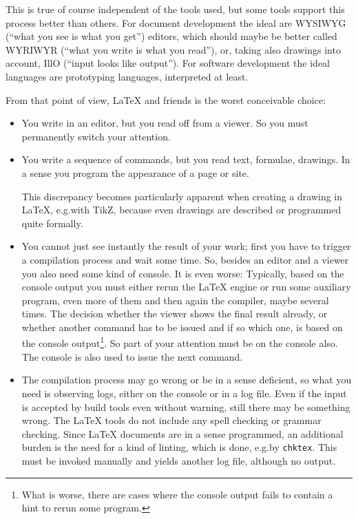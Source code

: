 This is true of course independent of the tools used, 
but some tools support this process better than others. 
For document development the ideal are WYSIWYG (``what you see is what you get'') editors, 
which should maybe be better called WYRIWYR (``what you write is what you read''), 
or, taking also drawings into account, IllO (``input looks like output''). %
For software development the ideal languages are prototyping languages, interpreted at least. 

From that point of view, \LaTeX{} and friends is the worst conceivable choice: 
%
\begin{itemize}
  \item
  You write in an editor, but you read off from a viewer. 
  So you must permanently switch your attention. 
  \item
  You write a sequence of commands, but you read text, formulae, drawings. 
  In a sense you program the appearance of a page or site. 

  This discrepancy becomes particularly apparent when creating a drawing in \LaTeX, 
  e.g.\@ with TikZ, because even drawings are described or programmed quite formally. 
  \item
  You cannot just see instantly the result of your work; 
  first you have to trigger a compilation process and wait some time. 
  So, besides an editor and a viewer you also need some kind of console. 
  It is even worse: 
  Typically, based on the console output you must either rerun the \LaTeX{} engine
  or run some auxiliary program, even more of them 
  and then again the compiler, maybe several times. 
  The decision whether the viewer shows the final result already, 
  or whether another command has to be issued and if so which one, 
  is based on the console output\footnote%
  {What is worse, there are cases where the console output fails 
  to contain a hint to rerun some program. 
  }. 
  So part of your attention must be on the console also. 
  The console is also used to issue the next command. 
  \item 
  The compilation process may go wrong or be in a sense deficient, 
  so what you need is observing logs, either on the console or in a log file. 
  Even if the input is accepted by build tools even without warning, 
  still there may be something wrong. 
  The \LaTeX{} tools do not include any spell checking or grammar checking. 
  Since \LaTeX{} documents are in a sense programmed, 
  an additional burden is the need for a kind of linting, 
  which is done, e.g.\@ by \texttt{chktex}. 
  This must be invoked manually and yields another log file, 
  although no output. 
\end{itemize}

